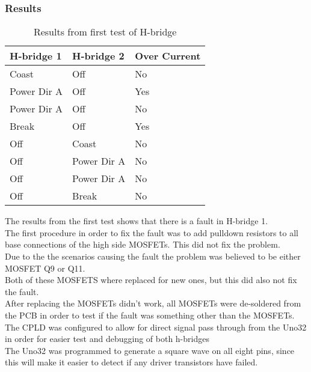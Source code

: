 \subsubsection{Results}
\begin{table}[h]
\centering
\begin{tabular}{l|l|l}
\textbf{H-bridge 1} & \textbf{H-bridge 2} & \textbf{Over Current} \\ \hline
\rowcolor[HTML]{EFEFEF} 
Coast               & Off                 & No                    \\ \hline
Power Dir A         & Off                 & Yes                   \\ \hline
\rowcolor[HTML]{EFEFEF} 
Power Dir A         & Off                 & No                    \\ \hline
Break               & Off                 & Yes                   \\ \hline
\rowcolor[HTML]{EFEFEF} 
Off                 & Coast               & No                    \\ \hline
Off                 & Power Dir A         & No                    \\ \hline
\rowcolor[HTML]{EFEFEF} 
Off                 & Power Dir A         & No                    \\ \hline
Off                 & Break               & No                   
\end{tabular}
\caption{Results from first test of H-bridge}
\label{firsthbridgetest}
\end{table} 
The results from the first test shows that there is a fault in H-bridge 1.\\ 
The first procedure in order to fix the fault was to add pulldown resistors to all base connections of the high side MOSFETs. This did not fix the problem.\\
Due to the the scenarios causing the fault the problem was believed to be either MOSFET Q9 or Q11.\\
Both of these MOSFETS where replaced for new ones, but this did also not fix the fault.\\
After replacing the MOSFETs didn't work, all MOSFETs were de-soldered from the PCB in order to test if the fault was something other than the MOSFETs.\\
The CPLD was configured to allow for direct signal pass through from the Uno32 in order for easier test and debugging of both h-bridges\\
The Uno32 was programmed to generate a square wave on all eight pins, since this will make it easier to detect if any driver transistors have failed.

